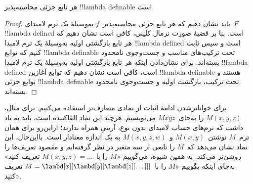 \documentclass[../../../include/open-logic-section]{subfiles}
\begin{document}

\begin{thm}
هر تابع جزئی محاسبه‌پذیر !!{lambda definable} است.
\end{thm}

\begin{proof}
باید نشان دهیم که هر تابع جزئی محاسبه‌پذیر~$f$ به‌وسیلهٔ یک ترم
لامبدای~$F$ !!{lambda defined} است. بنا بر قضیهٔ صورت نرمال کلینی، کافی
است نشان دهیم که هر تابع بازگشتی اولیه به‌وسیلهٔ یک ترم لامبدا
!!{lambda defined} است و سپس ثابت کنیم که توابع !!{lambda definable}
تحت ترکیب‌های مناسب و جست‌وجوی نامحدود بسته‌اند. برای نشان‌دادن اینکه هر
تابع بازگشتی اولیه به‌وسیلهٔ یک ترم لامبدا !!{lambda defined} است، کافی
است نشان دهیم که توابع آغازین !!{lambda definable} هستند و توابع جزئی
!!{lambda definable} تحت ترکیب، بازگشت اولیه و جست‌وجوی نامحدود بسته‌اند.
\end{proof}

برای خواناترشدن ادامهٔ اثبات از نمادی متعارف‌تر استفاده می‌کنیم. برای
مثال، $M(x, y, z)$ را به‌جای~$Mxyz$ می‌نویسیم. هرچند این نماد القاکننده
است، باید به یاد داشت که ترم‌های حساب لامبدای بدون نوع، آریتیِ همراه
ندارند؛ ازاین‌رو برای همان ترم~$M$ نوشتن~$M(x,y)$ و~$M(x,y,z,w)$ به یک
اندازه معنادار است. بااین‌حال، این نماد نشان می‌دهد که~$M$ را تابعی از
سه متغیر در نظر گرفته‌ایم و مقصود تعریف‌ها را روشن‌تر می‌کند. به همین
شیوه، می‌گوییم «$M$ را با~$M(x,y,z) = \dots$ تعریف کنید» به‌جای اینکه
بگوییم «$M$ را با~$M =
\lambd[x][\lambd[y][\lambd[z][\dots]]]$ تعریف کنید».
\end{document}
